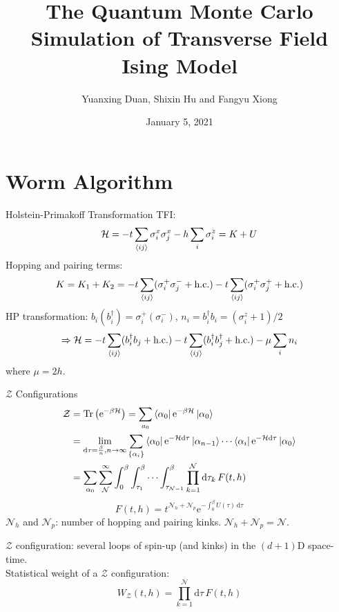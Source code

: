 \documentclass[aspectratio=43]{beamer}
\title{The Quantum Monte Carlo Simulation of Transverse Field Ising Model}
\author{Yuanxing Duan, Shixin Hu and Fangyu Xiong}
\institute{School of Physics, Peking University}
\date{January 5, 2021}
\DeclareMathOperator{\Tr}{Tr}
\begin{document}
\maketitle

\section{Worm Algorithm}
\begin{frame}{Holstein-Primakoff Transformation}
  TFI:
  \[
    \mathcal{H} = -t\sum_{\braket{ij}}\sigma_i^x\sigma_j^x - h\sum_{i}\sigma_i^z = K+U
  \]
  Hopping and pairing terms:
  \[
    K = K_1+K_2 = -t\sum_{\braket{ij}}(\sigma_i^+\sigma_j^-+\text{h.c.})-t\sum_{\braket{ij}}(\sigma_i^+\sigma_j^++\text{h.c.})
  \]
  HP transformation: $b_i(b_i^\dag) = \sigma_i^+(\sigma_i^-)$, $n_i = b_i^\dag b_i = (\sigma_i^z+1)/2$
  \[
    \Rightarrow \mathcal{H} = -t\sum_{\braket{ij}}(b_i^\dag b_j+\text{h.c.})-t\sum_{\braket{ij}}(b_i^\dag b_j^\dag+\text{h.c.})-\mu\sum_{i}n_i
  \]
  where $\mu = 2h$.
\end{frame}

\begin{frame}{$\mathcal{Z}$ Configurations}
  \begin{align*}
    \mathcal{Z} &= \Tr \left(\mathrm{e}^{-\beta \mathcal{H}}\right) = \sum_{a_0}\bra{\alpha_0}\mathrm{e}^{-\beta \mathcal{H}}\ket{\alpha_0}\\
                &= \lim_{\mathrm{d}\tau = \frac{\beta}{n}, n \to \infty} \sum_{\{\alpha_i\}}\bra{\alpha_0}\mathrm{e}^{-\mathcal{H}\mathrm{d}\tau}\ket{\alpha_{n-1}}\cdots \bra{\alpha_i}\mathrm{e}^{-\mathcal{H}\mathrm{d}\tau}\ket{\alpha_0}\\
                &= \sum_{\alpha_0}\sum_{\mathcal{N}}^{\infty}\int_{0}^{\beta}\int_{\tau_1}^{\beta}\cdots \int_{\tau_{\mathcal{N}-1}}^{\beta} \prod_{k=1}^{\mathcal{N}}\mathrm{d}\tau_k\,F(t, h)
  \end{align*}
  \[
    F(t, h) = t^{\mathcal{N}_h+\mathcal{N}_p}\mathrm{e}^{-\int_{0}^{\beta}U(\tau)\,\mathrm{d}\tau}
  \]
  $\mathcal{N}_h$ and $\mathcal{N}_p$: number of hopping and pairing kinks. $\mathcal{N}_h + \mathcal{N}_p = \mathcal{N}$.

  $\mathcal{Z}$ configuration: several loops of spin-up (and kinks) in the $(d+1)$D space-time.\\
  Statistical weight of a $\mathcal{Z}$ configuration:
  \[
    W_{\mathcal{Z}}(t, h) = \prod_{k=1}^{\mathcal{N}}\mathrm{d}\tau\,F(t, h)
  \]
\end{frame}
\end{document}
